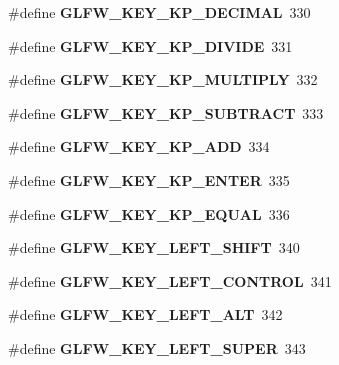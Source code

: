 \begin{DoxyCompactItemize}
\#define {\bfseries G\+L\+F\+W\+\_\+\+K\+E\+Y\+\_\+\+K\+P\+\_\+\+D\+E\+C\+I\+M\+AL}~330
\item 
\mbox{\label{group__keys_gabca1733780a273d549129ad0f250d1e5}} 
\#define {\bfseries G\+L\+F\+W\+\_\+\+K\+E\+Y\+\_\+\+K\+P\+\_\+\+D\+I\+V\+I\+DE}~331
\item 
\mbox{\label{group__keys_ga9ada267eb0e78ed2ada8701dd24a56ef}} 
\#define {\bfseries G\+L\+F\+W\+\_\+\+K\+E\+Y\+\_\+\+K\+P\+\_\+\+M\+U\+L\+T\+I\+P\+LY}~332
\item 
\mbox{\label{group__keys_gaa3dbd60782ff93d6082a124bce1fa236}} 
\#define {\bfseries G\+L\+F\+W\+\_\+\+K\+E\+Y\+\_\+\+K\+P\+\_\+\+S\+U\+B\+T\+R\+A\+CT}~333
\item 
\mbox{\label{group__keys_gad09c7c98acc79e89aa6a0a91275becac}} 
\#define {\bfseries G\+L\+F\+W\+\_\+\+K\+E\+Y\+\_\+\+K\+P\+\_\+\+A\+DD}~334
\item 
\mbox{\label{group__keys_ga4f728f8738f2986bd63eedd3d412e8cf}} 
\#define {\bfseries G\+L\+F\+W\+\_\+\+K\+E\+Y\+\_\+\+K\+P\+\_\+\+E\+N\+T\+ER}~335
\item 
\mbox{\label{group__keys_gaebdc76d4a808191e6d21b7e4ad2acd97}} 
\#define {\bfseries G\+L\+F\+W\+\_\+\+K\+E\+Y\+\_\+\+K\+P\+\_\+\+E\+Q\+U\+AL}~336
\item 
\mbox{\label{group__keys_ga8a530a28a65c44ab5d00b759b756d3f6}} 
\#define {\bfseries G\+L\+F\+W\+\_\+\+K\+E\+Y\+\_\+\+L\+E\+F\+T\+\_\+\+S\+H\+I\+FT}~340
\item 
\mbox{\label{group__keys_ga9f97b743e81460ac4b2deddecd10a464}} 
\#define {\bfseries G\+L\+F\+W\+\_\+\+K\+E\+Y\+\_\+\+L\+E\+F\+T\+\_\+\+C\+O\+N\+T\+R\+OL}~341
\item 
\mbox{\label{group__keys_ga7f27dabf63a7789daa31e1c96790219b}} 
\#define {\bfseries G\+L\+F\+W\+\_\+\+K\+E\+Y\+\_\+\+L\+E\+F\+T\+\_\+\+A\+LT}~342
\item 
\mbox{\label{group__keys_gafb1207c91997fc295afd1835fbc5641a}} 
\#define {\bfseries G\+L\+F\+W\+\_\+\+K\+E\+Y\+\_\+\+L\+E\+F\+T\+\_\+\+S\+U\+P\+ER}~343

\end{DoxyCompactItemize}
